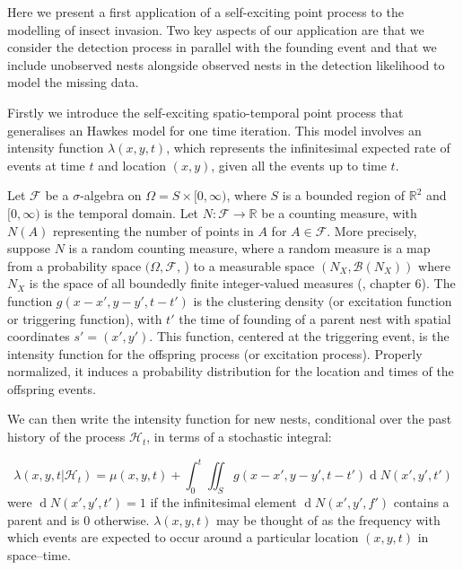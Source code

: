 \documentclass{article}
\renewcommand{\d}[1]{\ensuremath{\operatorname{d}\!{#1}}}
\begin{document}
Here we present a first application of a self-exciting point process to the modelling of insect invasion. Two key aspects of our application are that we consider the detection process in parallel with the founding event and that we include unobserved nests alongside observed nests in the detection likelihood to model the missing data.

Firstly we introduce the self-exciting spatio-temporal point process that generalises an Hawkes model \cite{Hawkes71} for one time iteration. This model involves an intensity function $\lambda(x, y, t)$, which represents the infinitesimal expected rate of events at time $t$ and location $(x, y)$, given all the events up to time $t$.

Let $\mathcal{F}$ be a $\sigma$-algebra on $\Omega = S \times [0, \infty )$, where $S$ is a bounded region of $\mathbb{R}^2$ and $[0, \infty)$ is the temporal domain. Let $N: \mathcal{F} \to \mathbb{R}$ be a counting measure, with $N(A)$ representing the number of points in $A$ for $A \in \mathcal{F}$. More precisely, suppose $N$ is a random counting measure, where a random measure is a map from a probability space $(\Omega, \mathcal{F}$, ) to a measurable space $(N_{X}, \mathcal{B}(N_{X}))$ where $N_{X}$ is the space of all boundedly finite integer-valued measures (\cite{Daley}, chapter 6). The function $g(x - x', y - y', t - t')$  is the clustering density (or excitation function or triggering function), with $t'$ the time of founding of a parent nest with spatial coordinates $s' = (x', y')$. {\color{red} This function, centered at the triggering event, is the intensity function for the offspring process (or excitation process). Properly normalized, it induces a probability distribution for the location and times of the offspring events.}

We can then write the intensity function for new nests, conditional over the past history of the process $\mathcal{H}_t$, in terms of a stochastic integral:

\begin{equation}\label{eq:intensity}
    \lambda(x, y, t | \mathcal{H}_t) = \mu(x, y, t) + \int_{0}^{t} \iint_{S} g(x - x', y - y', t - t') \d N(x', y', t')
\end{equation}
were $\d N(x', y', t') = 1$ if the infinitesimal element $\d N(x', y', f')$ contains a parent and is 0 otherwise. $\lambda(x, y, t)$ may be thought of as the frequency with which events are expected to occur around a particular location $(x, y, t)$ in space–time.
\end{document}
